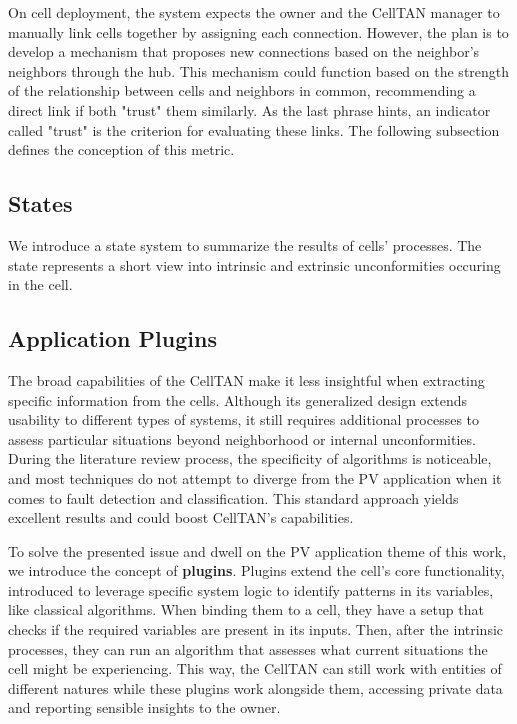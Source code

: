On cell deployment, the system expects the owner and the CellTAN manager to manually link cells together by assigning each connection. However, the plan is to develop a mechanism that proposes new connections based on the neighbor's neighbors through the hub. This mechanism could function based on the strength of the relationship between cells and neighbors in common, recommending a direct link if both "trust" them similarly. As the last phrase hints, an indicator called "trust" is the criterion for evaluating these links. The following subsection defines the conception of this metric.

\subsection{States}

We introduce a state system to summarize the results of cells' processes. The state represents a short view into intrinsic and extrinsic unconformities occuring in the cell.

\subsection{Application Plugins}


The broad capabilities of the CellTAN make it less insightful when extracting specific information from the cells. Although its generalized design extends usability to different types of systems, it still requires additional processes to assess particular situations beyond neighborhood or internal unconformities. During the literature review process, the specificity of algorithms is noticeable, and most techniques do not attempt to diverge from the PV application when it comes to fault detection and classification. This standard approach yields excellent results and could boost CellTAN's capabilities.

To solve the presented issue and dwell on the PV application theme of this work, we introduce the concept of \textbf{plugins}. Plugins extend the cell's core functionality, introduced to leverage specific system logic to identify patterns in its variables, like classical algorithms. When binding them to a cell, they have a setup that checks if the required variables are present in its inputs. Then, after the intrinsic processes, they can run an algorithm that assesses what current situations the cell might be experiencing. This way, the CellTAN can still work with entities of different natures while these plugins work alongside them, accessing private data and reporting sensible insights to the owner. 


